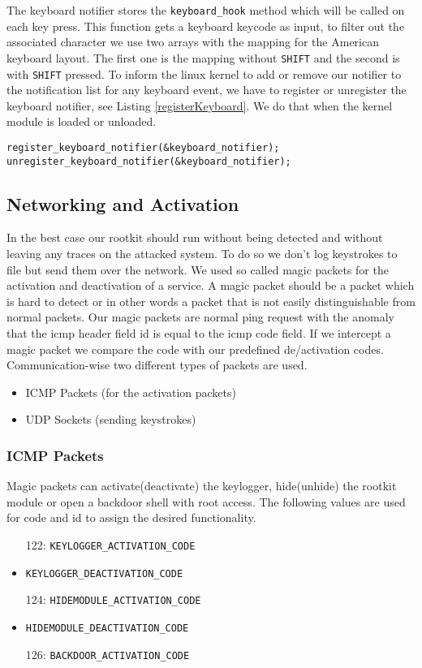 \documentclass[12pt]{article}
\begin{document}
The keyboard notifier stores the \lstinline{keyboard_hook} method which will be called on each key press. This function gets a keyboard keycode as input, to filter out the associated character we use two arrays with the mapping for the American keyboard layout. The first one is the mapping without \lstinline{SHIFT} and the second is with \lstinline{SHIFT} pressed.
To inform the linux kernel to add or remove our notifier to the notification list for any keyboard event, we have to register or unregister the keyboard notifier, see Listing \ref{registerKeyboard}. We do that when the kernel module is loaded or unloaded.


\begin{lstlisting}[caption=Register Keyboard, label=registerKeyboard]
register_keyboard_notifier(&keyboard_notifier);
unregister_keyboard_notifier(&keyboard_notifier);
\end{lstlisting}



\subsection{Networking and Activation}
In the best case our rootkit should run without being detected and without leaving any traces on the attacked system. To do so we don't log keystrokes to file but send them over the network. We used so called magic packets for the activation and deactivation of a service. A magic packet should be a packet which is hard to detect or in other words a packet that is not easily distinguishable from normal packets. Our magic packets are normal ping request with the anomaly that the icmp header field id is equal to the icmp code field. If we intercept a magic packet we compare the code with our predefined de/activation codes.
\label{sec:magicpackage}
\newline Communication-wise two different types of packets are used.
\begin{itemize}
	\item ICMP Packets (for the activation packets)
	\item UDP Sockets (sending keystrokes)
\end{itemize}
\subsubsection{ICMP Packets}
Magic packets can activate(deactivate) the keylogger, hide(unhide) the rootkit module or open a backdoor shell with root access. The following values are used for code and id to assign the desired functionality.
\begin{itemize}
	\item[122:] \lstinline{KEYLOGGER_ACTIVATION_CODE}
	\item[123:] \lstinline{KEYLOGGER_DEACTIVATION_CODE}
	\item[124:] \lstinline{HIDEMODULE_ACTIVATION_CODE}
	\item[125:] \lstinline{HIDEMODULE_DEACTIVATION_CODE}
	\item[126:] \lstinline{BACKDOOR_ACTIVATION_CODE}
\end{itemize}
\end{document}
